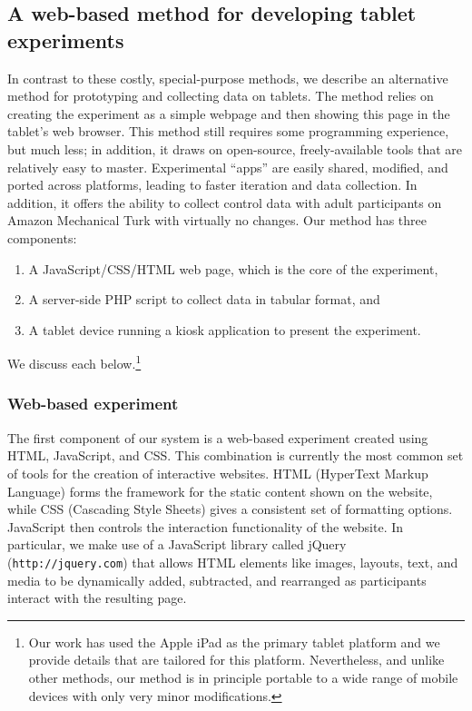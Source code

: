 \documentclass[man,noapacite]{apa2}
\begin{document}
\subsection{A web-based method for developing tablet experiments}

In contrast to these costly, special-purpose methods, we describe an alternative method for prototyping and collecting data on tablets. The method relies on creating the experiment as a simple webpage and then showing this page in the tablet's web browser. This method still requires some programming experience, but much less; in addition, it draws on open-source, freely-available tools that are relatively easy to master. Experimental ``apps'' are easily shared, modified, and ported across platforms, leading to faster iteration and data collection. In addition, it offers the ability to collect control data with adult participants on Amazon Mechanical Turk \cite{paolacci2010,crump2013} with virtually no changes. Our method has three components:

\begin{enumerate}
\item A JavaScript/CSS/HTML web page, which is the core of the experiment, 
\item A server-side PHP script to collect data in tabular format, and
\item A tablet device running a kiosk application to present the experiment. 
\end{enumerate}

\noindent We discuss each below.\footnote{Our work has used the Apple iPad as the primary tablet platform and we provide details that are tailored for this platform. Nevertheless, and unlike other methods, our method is in principle portable to a wide range of mobile devices with only very minor modifications.}

\subsubsection{Web-based experiment}

The first component of our system is a web-based experiment created using HTML, JavaScript, and CSS. This combination is currently the most common set of tools for the creation of interactive websites. HTML (HyperText Markup Language) forms the framework for the static content shown on the website, while CSS (Cascading Style Sheets) gives a consistent set of formatting options. JavaScript then controls the interaction functionality of the website. In particular, we make use of a JavaScript library called jQuery (\texttt{http://jquery.com}) that allows HTML elements like images, layouts, text, and media to be dynamically added, subtracted, and rearranged as participants interact with the resulting page. 
\end{document}

